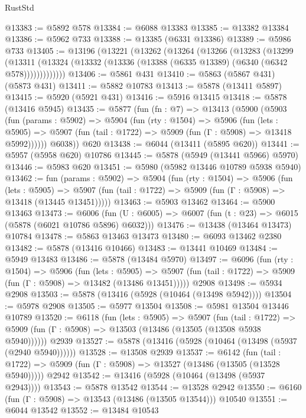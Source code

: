 \begin{lexlean}{RustStd}
\begin{coremodule}
@13383 := @5892 @578
@13384 := @6088 @13383
@13385 := @13382 @13384
@13386 := @5962 @733
@13388 := @13385 (@6331 @13386)
@13389 := @5986 @733
@13405 := @13196
    (@13221
      (@13262
        (@13264
          (@13266
            (@13283
              (@13299
                (@13311
                  (@13324 (@13332 (@13336 (@13388 (@6335 @13389) (@6340 (@6342 @578)))))))))))))
@13406 := @5861 @431
@13410 := @5863 (@5867 @431) (@5873 @431)
@13411 := @5882 @10783
@13413 := @5878 (@13411 @5897)
@13415 := @5920 (@5921 @431)
@13416 := @5916 @13415
@13418 := @5878 (@13416 @5945)
@13435 := @5877
    (fun (fn : @7) =>
    @13413
      (@5900
        (@5903
          (fun (params : @5902) =>
          @5904
            (fun (rty : @1504) =>
            @5906
              (fun (lets : @5905) =>
              @5907 (fun (tail : @1722) => @5909 (fun (Γ : @5908) => @13418 @5992))))))
        @6038))
    @620
@13438 := @6044 (@13411 (@5895 @620))
@13441 := @5957 (@5958 @620) @10786
@13445 := @5878 (@5949 (@13441 @5966) @5970)
@13446 := @5983 @620
@13451 := @5980 (@5982 @13446 @10789 @5938 @5940)
@13462 := fun (params : @5902) =>
  @5904
    (fun (rty : @1504) =>
    @5906
      (fun (lets : @5905) =>
      @5907 (fun (tail : @1722) => @5909 (fun (Γ : @5908) => @13418 (@13445 @13451)))))
@13463 := @5903 @13462
@13464 := @5900 @13463
@13473 := @6006
    (fun (U : @6005) => @6007 (fun (t : @23) => @6015 (@5878 (@6021 @10786 @5896) @6032)))
@13476 := @13438 (@13464 @13473) @10784
@13478 := @5863 @13463 @13473
@13480 := @6093 @13462 @2380
@13482 := @5878 (@13416 @10466)
@13483 := @13441 @10469
@13484 := @5949 @13483
@13486 := @5878 (@13484 @5970)
@13497 := @6096
    (fun (rty : @1504) =>
    @5906
      (fun (lets : @5905) =>
      @5907 (fun (tail : @1722) => @5909 (fun (Γ : @5908) => @13482 (@13486 @13451)))))
    @2908
@13498 := @5934 @2908
@13503 := @5878 (@13416 (@5928 (@10464 (@13498 @5942))))
@13504 := @5978 @2908
@13505 := @5977 @13504
@13508 := @5981 @13504 @13446 @10789
@13520 := @6118
    (fun (lets : @5905) =>
    @5907
      (fun (tail : @1722) =>
      @5909 (fun (Γ : @5908) => @13503 (@13486 (@13505 (@13508 @5938 @5940))))))
    @2939
@13527 := @5878 (@13416 (@5928 (@10464 (@13498 (@5937 (@2940 @5940))))))
@13528 := @13508 @2939
@13537 := @6142
    (fun (tail : @1722) => @5909 (fun (Γ : @5908) => @13527 (@13486 (@13505 (@13528 @5940)))))
    @2942
@13542 := @13416 (@5928 (@10464 (@13498 (@5937 @2943))))
@13543 := @5878 @13542
@13544 := @13528 @2942
@13550 := @6160 (fun (Γ : @5908) => @13543 (@13486 (@13505 @13544))) @10540
@13551 := @6044 @13542
@13552 := @13484 @10543

\end{coremodule}
\end{lexlean}

